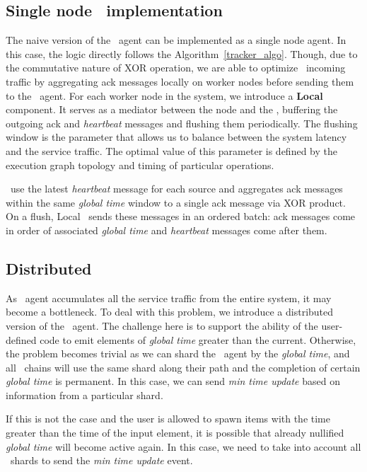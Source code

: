 
\subsection{Single node \tracker\ implementation}
The naive version of the \tracker\ agent can be implemented as a single node agent. In this case, the logic directly follows the Algorithm~\ref{tracker_algo}. Though, due to the commutative nature of XOR operation, we are able to optimize \tracker\ incoming traffic by aggregating ack messages locally on worker nodes before sending them to the \tracker\ agent. For each worker node in the system, we introduce a \textbf{Local \tracker} component. It serves as a mediator between the node and the \tracker, buffering the outgoing ack and \textit{heartbeat} messages and flushing them periodically. The flushing window is the parameter that allows us to balance between the system latency and the service traffic. The optimal value of this parameter is defined by the execution graph topology and timing of particular operations.

\tracker\ use the latest \textit{heartbeat} message for each source and aggregates ack messages within the same \textit{global time} window to a single ack message via XOR product. On a flush, Local \tracker\ sends these messages in an ordered batch: ack messages come in order of associated \textit{global time} and \textit{heartbeat} messages come after them.

\subsection{Distributed \tracker}

As \tracker\ agent accumulates all the service traffic from the entire system, it may become a bottleneck. To deal with this problem, we introduce a distributed version of the \tracker\ agent. The challenge here is to support the ability of the user-defined code to emit elements of \textit{global time} greater than the current. Otherwise, the problem becomes trivial as we can shard the \tracker\ agent by the \textit{global time}, and all \tracker\ chains will use the same shard along their path and the completion of certain \textit{global time} is permanent. In this case, we can send \textit{min time update} based on information from a particular shard.

If this is not the case and the user is allowed to spawn items with the time greater than the time of the input element, it is possible that already nullified \textit{global time} will become active again. In this case, we need to take into account all \tracker\ shards to send the \textit{min time update} event.


